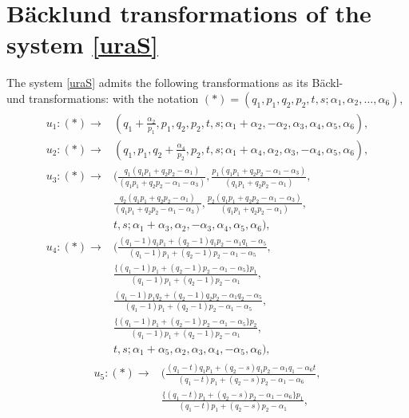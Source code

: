 \section{B{\"a}cklund transformations of the system \eqref{uraS}}

\begin{thm}\label{th:in3}
The system \eqref{uraS} admits the following transformations as its B{\"a}ckl-\\
und transformations\rm{:\rm} with the notation $(*)=(q_1,p_1,q_2,p_2,t,s;\alpha_1,\alpha_2,\dots,\alpha_6),$
\begin{align}
\begin{split}
        u_1: (*) \rightarrow &(q_1+\frac{\alpha_2}{p_1},p_1,q_2,p_2,t,s;\alpha_1+\alpha_2,-\alpha_2,\alpha_3,\alpha_4,\alpha_5,\alpha_6), \\
        u_2: (*) \rightarrow &(q_1,p_1,q_2+\frac{\alpha_4}{p_2},p_2,t,s;\alpha_1+\alpha_4,\alpha_2,\alpha_3,-\alpha_4,\alpha_5,\alpha_6),\\
        u_3: (*) \rightarrow &(\frac{q_1(q_1p_1+q_2p_2-\alpha_1)}{(q_1p_1+q_2p_2-\alpha_1-\alpha_3)},\frac{p_1(q_1p_1+q_2p_2-\alpha_1-\alpha_3)}{(q_1p_1+q_2p_2-\alpha_1)},\\
        &\frac{q_2(q_1p_1+q_2p_2-\alpha_1)}{(q_1p_1+q_2p_2-\alpha_1-\alpha_3)},\frac{p_2(q_1p_1+q_2p_2-\alpha_1-\alpha_3)}{(q_1p_1+q_2p_2-\alpha_1)},\\
        &t,s;\alpha_1+\alpha_3,\alpha_2,-\alpha_3,\alpha_4,\alpha_5,\alpha_6),\\
        u_4: (*) \rightarrow &(\frac{(q_1-1)q_1p_1+(q_2-1)q_1p_2-\alpha_1q_1-\alpha_5}{(q_1-1)p_1+(q_2-1)p_2-\alpha_1-\alpha_5},\\
        &\frac{\{(q_1-1)p_1+(q_2-1)p_2-\alpha_1-\alpha_5\}p_1}{(q_1-1)p_1+(q_2-1)p_2-\alpha_1},\\
        &\frac{(q_1-1)p_1q_2+(q_2-1)q_2p_2-\alpha_1q_2-\alpha_5}{(q_1-1)p_1+(q_2-1)p_2-\alpha_1-\alpha_5},\\
        &\frac{\{(q_1-1)p_1+(q_2-1)p_2-\alpha_1-\alpha_5\}p_2}{(q_1-1)p_1+(q_2-1)p_2-\alpha_1},\\
        &t,s;\alpha_1+\alpha_5,\alpha_2,\alpha_3,\alpha_4,-\alpha_5,\alpha_6),
        \end{split}
        \end{align}
        \begin{align*}
        u_5: (*) \rightarrow &(\frac{(q_1-t)q_1p_1+(q_2-s)q_1p_2-\alpha_1q_1-\alpha_6t}{(q_1-t)p_1+(q_2-s)p_2-\alpha_1-\alpha_6},\\
        &\frac{\{(q_1-t)p_1+(q_2-s)p_2-\alpha_1-\alpha_6\}p_1}{(q_1-t)p_1+(q_2-s)p_2-\alpha_1},\\

\end{align*}
\end{thm}
